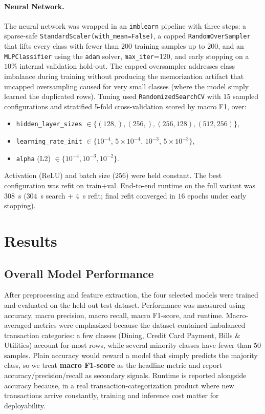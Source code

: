 \documentclass[11pt]{article}
\begin{document}
\paragraph{Neural Network.}
The neural network was wrapped in an \texttt{imblearn} pipeline with three
steps: a sparse-safe \texttt{StandardScaler(with\_mean=False)}, a
capped \texttt{RandomOverSampler} that lifts every class with fewer
than $200$ training samples up to $200$, and an \texttt{MLPClassifier} using
the \texttt{adam} solver, \texttt{max\_iter}=120, and early stopping on a
$10\%$ internal validation hold-out. The capped oversampler addresses class
imbalance during training without producing the memorization artifact that
uncapped oversampling caused for very small classes (where the model
simply learned the duplicated rows). Tuning
used \texttt{RandomizedSearchCV} with $15$ sampled configurations and
stratified 5-fold cross-validation scored by macro F1, over:
\begin{itemize}[leftmargin=1.5em, itemsep=0pt, topsep=2pt]
\item \texttt{hidden\_layer\_sizes} $\in \{(128,), (256,), (256,128), (512,256)\}$,
\item \texttt{learning\_rate\_init} $\in \{10^{-4},\, 5{\times}10^{-4},\, 10^{-3},\, 5{\times}10^{-3}\}$,
\item \texttt{alpha} (L2) $\in \{10^{-4}, 10^{-3}, 10^{-2}\}$.
\end{itemize}
Activation (ReLU) and batch size ($256$) were held constant. The best
configuration was refit on train+val. End-to-end runtime on the full
variant was $308$~s ($304$~s search + $4$~s refit; final refit converged in
$16$ epochs under early stopping).

\section{Results}

\subsection{Overall Model Performance}

After preprocessing and feature extraction, the four selected models were
trained and evaluated on the held-out test dataset. Performance was measured
using accuracy, macro precision, macro recall, macro F1-score, and runtime.
Macro-averaged metrics were emphasized because the dataset contained
imbalanced transaction categories: a few classes (Dining, Credit Card
Payment, Bills \& Utilities) account for most rows, while several minority
classes have fewer than $50$ samples. Plain accuracy would reward a model
that simply predicts the majority class, so we treat \textbf{macro
F1-score} as the headline metric and report accuracy/precision/recall as
secondary signals. Runtime is reported alongside accuracy because, in a real
transaction-categorization product where new transactions arrive
constantly, training and inference cost matter for deployability.
\end{document}
